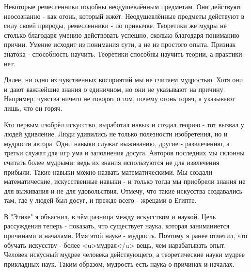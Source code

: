 \documentclass{article}
\begin{document}
Некоторые ремесленники подобны неодушевлённым предметам. Они действуют неосознанно - как огонь, который жжёт. Неодушевлённые предметы действуют в силу своей природы, ремесленники - по привычке. Теоретики же мудры не столько благодаря умению действовать успешно, сколько благодаря пониманию причин. Умение исходит из понимания сути, а не из простого опыта. Признак знатока - способность научить. Теоретики способны научить теории, а практики - нет.

Далее, ни одно из чувственных восприятий мы не считаем мудростью. Хотя они и дают важнейшие знания о единичном, но они не указывают на причину. Например, чувства ничего не говорят о том, почему огонь горяч, а указывают лишь, что он горяч.

Кто первым изобрёл искусство, выработал навык и создал теорию - тот вызвал у людей удивление. Люди удивились не только полезности изобретения, но и мудрости автора. Одни навыки служат выживанию, другие - развлечению, а третьи служат для игр ума и заполнения досуга. Авторов последних мы склонны считать более мудрыми: ведь их знания используются не для извлечения прибыли. Такие навыки можно назвать математическими. Мы создали математические, искусственные навыки - и только тогда мы приобрели знания не для выживания и не для удовольствия. Отмечу, что такие искусства создавались там, где у людей был досуг, и прежде всего - жрецами в Египте.

В "Этике" я объяснил, в чём разница между искусством
\footnotemark[5]
и наукой.
\footnotemark[3]
Цель рассуждения теперь - показать, что существует наука, которая заниманиется причинами и началами. Имя этой науке - мудрость. Поэтому я ранее отметил, что обучать искусству - более <u>мудрая</u> вещь, чем нарабатывать опыт. Человек искусный мудрее человека действующего, а теоретические науки мудрее прикладных наук. Таким образом, мудрость есть наука о причинах и началах.
\end{document}
